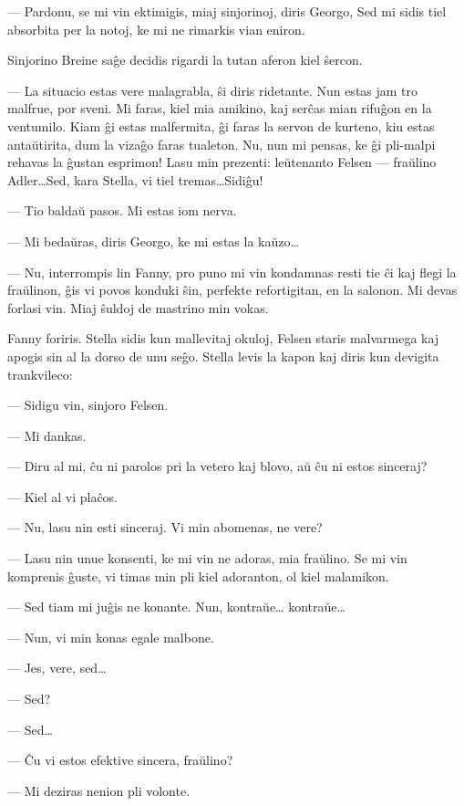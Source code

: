  --- Pardonu, se mi vin ektimigis, miaj sinjorinoj, diris Georgo, Sed
mi sidis tiel absorbita per la notoj, ke mi ne rimarkis vian eniron.

   Sinjorino Breine sa\^ge decidis rigardi la tutan aferon kiel \^sercon.

 --- La situacio estas vere malagrabla, \^si diris ridetante. Nun estas
jam tro malfrue, por sveni. Mi faras, kiel mia amikino, kaj ser\^cas
mian rifu\^gon en la ventumilo. Kiam \^gi estas malfermita, \^gi
faras la servon de kurteno, kiu estas anta\u utirita, dum la
viza\^go faras tualeton. Nu, nun mi pensas, ke \^gi pli-malpi
rehavas la \^gustan esprimon! Lasu min prezenti: le\u utenanto
Felsen --- fra\u ulino Adler\dots Sed, kara Stella, vi tiel
tremas\dots Sidi\^gu!

 --- Tio balda\u u pasos. Mi estas iom nerva.

 --- Mi beda\u uras, diris Georgo, ke mi estas la ka\u uzo\dots

 --- Nu, interrompis lin Fanny, pro puno mi vin kondamnas resti tie
\^ci kaj flegi la fra\u ulinon, \^gis vi povos konduki \^sin,
perfekte refortigitan, en la salonon. Mi devas forlasi vin. Miaj
\^suldoj de mastrino min vokas.

   Fanny foriris. Stella sidis kun mallevitaj okuloj, Felsen staris
malvarmega kaj apogis sin al la dorso de unu se\^go. Stella levis la
kapon kaj diris kun devigita trankvileco:

 --- Sidigu vin, sinjoro Felsen.

 --- Mi dankas.

 --- Diru al mi, \^cu ni parolos pri la vetero kaj blovo, a\u u \^cu ni
estos sinceraj?

 --- Kiel al vi pla\^cos.

 --- Nu, lasu nin esti sinceraj. Vi min abomenas, ne vere?

 --- Lasu nin unue konsenti, ke mi vin ne adoras, mia fra\u ulino. Se
mi vin komprenis \^guste, vi timas min pli kiel adoranton, ol kiel
malamikon.

 --- Sed tiam mi ju\^gis ne konante. Nun, kontra\u ue\dots
kontra\u ue\dots

 --- Nun, vi min konas egale malbone.

 --- Jes, vere, sed\dots

 --- Sed?

 --- Sed\dots

 --- \^Cu vi estos efektive sincera, fra\u ulino?

 --- Mi deziras nenion pli volonte.

